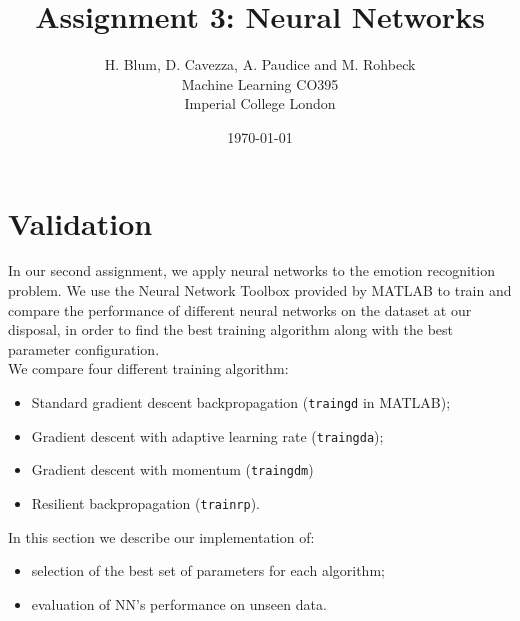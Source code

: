 \documentclass{article}
\begin{document}
\author{H. Blum, D. Cavezza, A. Paudice and M. Rohbeck\\
 Machine Learning CO395\\
  Imperial College London}
\date{\today}
\title{Assignment 3: Neural Networks}
\maketitle

\section{Validation}
In our second assignment, we apply neural networks to the emotion recognition problem. We use the Neural Network Toolbox provided by MATLAB to train and compare the performance of different neural networks on the dataset at our disposal, in order to find the best training algorithm along with the best parameter configuration.\\
We compare four different training algorithm:
\begin{itemize}
	\item Standard gradient descent backpropagation (\verb$traingd$ in MATLAB);
	\item Gradient descent with adaptive learning rate (\verb$traingda$);
	\item Gradient descent with momentum (\verb$traingdm$)
	\item Resilient backpropagation (\verb$trainrp$).
\end{itemize}
In this section we describe our implementation of:
\begin{itemize}
	\item selection of the best set of parameters for each algorithm;
	\item evaluation of NN's performance on unseen data.
\end{itemize}
\end{document}
